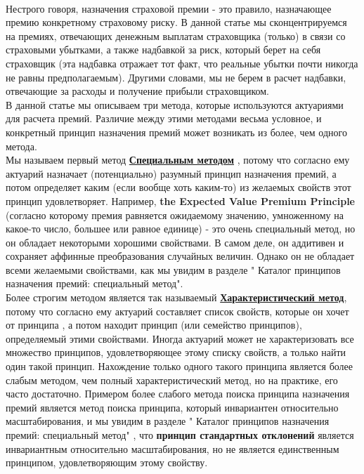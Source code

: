 \documentclass[12pt,a4paper]{article}
\begin{document}
{\bf {}}\\
Нестрого говоря, { назначения страховой премии} - это правило, назначающее премию конкретному страховому риску. В данной статье мы сконцентрируемся на премиях, отвечающих денежным выплатам страховщика (только)  в связи со страховыми убытками, а также надбавкой за риск, который берет на себя страховщик (эта надбавка  отражает  тот факт, что реальные убытки почти никогда не равны предполагаемым). Другими словами, мы не берем в расчет надбавки, отвечающие  за расходы и получение прибыли страховщиком.\\
В данной статье мы описываем три метода, которые используются актуариями для расчета премий. Различие между этими методами весьма условное, и конкретный принцип назначения премий может возникать из более, чем одного метода.\\
Мы называем первый метод   {\bf \underline {Специальным методом}} , потому что согласно ему актуарий назначает (потенциально) разумный принцип назначения премий, а потом определяет каким (если вообще хоть каким-то) из желаемых свойств этот принцип удовлетворяет. Например, {\bf the Expected Value Premium Principle} (согласно которому премия равняется ожидаемому значению, умноженному на какое-то число, большее или равное единице) - это очень специальный метод, но он обладает некоторыми хорошими свойствами. В самом деле, он аддитивен и сохраняет аффинные преобразования случайных величин. Однако он не обладает  всеми  желаемыми свойствами, как мы увидим в разделе " Каталог принципов назначения премий: специальный метод".\\
Более строгим методом является так называемый {\bf \underline {Характеристический метод}}, потому что согласно ему актуарий составляет список свойств, которые он хочет от принципа , а потом находит принцип (или семейство принципов), определяемый этими свойствами. Иногда актуарий может не  характеризовать все множество принципов, удовлетворяющее этому списку свойств,  а только найти один такой принцип. Нахождение только одного такого принципа является более слабым методом, чем полный характеристический метод, но на практике, его часто достаточно. Примером более слабого метода поиска принципа назначения премий является метод поиска принципа, который инвариантен относительно масштабирования, и мы увидим в разделе  " Каталог принципов назначения премий: специальный метод" , что {\bf принцип стандартных отклонений} является инвариантным относительно масштабирования, но не является единственным принципом, удовлетворяющим этому свойству. \\
\end{document}
